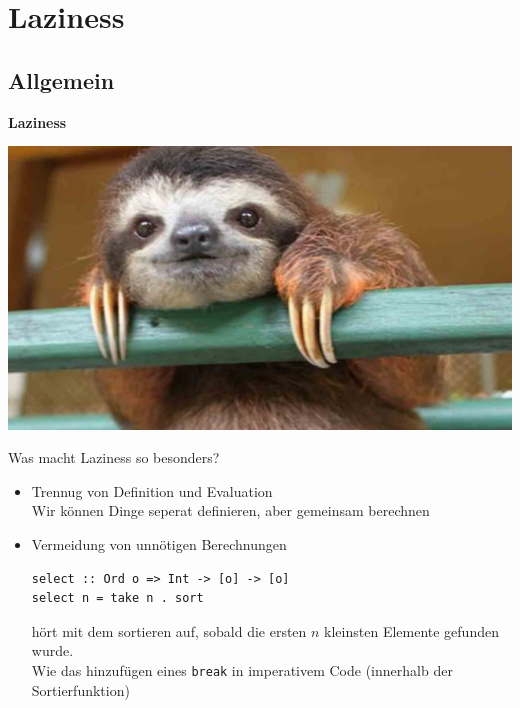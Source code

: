 \documentclass{beamer}
\begin{document}
\section{Laziness}

\subsection{Allgemein}

\begin{frame}
\begin{center}
\textbf{Laziness}\bigskip

\includegraphics[scale=0.15]{maxresdefault.jpg} 
\end{center}
\end{frame}

\begin{frame}[fragile]
Was macht Laziness so besonders?\pause
\begin{itemize}
 \item Trennug von Definition und Evaluation\\\pause
       Wir können Dinge seperat definieren, aber gemeinsam berechnen
 \pause
 \item Vermeidung von unnötigen Berechnungen\\\pause
\begin{verbatim}
select :: Ord o => Int -> [o] -> [o]
select n = take n . sort
\end{verbatim}
       \pause
       hört mit dem sortieren auf, sobald die ersten $n$ kleinsten Elemente gefunden wurde.\\\pause
       Wie das hinzufügen eines \texttt{break} in imperativem Code (innerhalb der Sortierfunktion)
\end{itemize}
\end{frame}
\end{document}
